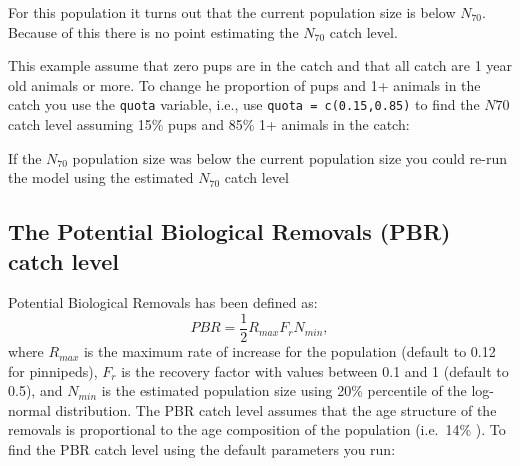 \documentclass[
]{article}
\newenvironment{Shaded}{\begin{snugshade}}{\end{snugshade}}
\newcommand{\CommentTok}[1]{\textcolor[rgb]{0.56,0.35,0.01}{\textit{#1}}}
\newcommand{\DataTypeTok}[1]{\textcolor[rgb]{0.13,0.29,0.53}{#1}}
\newcommand{\KeywordTok}[1]{\textcolor[rgb]{0.13,0.29,0.53}{\textbf{#1}}}
\newcommand{\NormalTok}[1]{#1}
\newcommand{\OperatorTok}[1]{\textcolor[rgb]{0.81,0.36,0.00}{\textbf{#1}}}
\newcommand{\StringTok}[1]{\textcolor[rgb]{0.31,0.60,0.02}{#1}}
\begin{document}
For this population it turns out that the current population size is
below \(N_{70}\). Because of this there is no point estimating the
\(N_{70}\) catch level.

This example assume that zero pups are in the catch and that all catch
are 1 year old animals or more. To change he proportion of pups and 1+
animals in the catch you use the \texttt{quota} variable, i.e., use
\texttt{quota\ =\ c(0.15,0.85)} to find the \(N{70}\) catch level
assuming 15\% pups and 85\% 1+ animals in the catch:

If the \(N_{70}\) population size was below the current population size
you could re-run the model using the estimated \(N_{70}\) catch level

\begin{Shaded}
\end{Shaded}

\hypertarget{the-potential-biological-removals-pbr-catch-level}{%
\subsection{The Potential Biological Removals (PBR) catch
level}\label{the-potential-biological-removals-pbr-catch-level}}

Potential Biological Removals has been defined as:
\[PBR=\frac{1}{2}R_{max}F_rN_{min},\] where \(R_{max}\) is the maximum
rate of increase for the population (default to 0.12 for pinnipeds),
\(F_r\) is the recovery factor with values between 0.1 and 1 (default to
0.5), and \(N_{min}\) is the estimated population size using 20\%
percentile of the log-normal distribution. The PBR catch level assumes
that the age structure of the removals is proportional to the age
composition of the population (i.e.~14\% ). To find the PBR catch level
using the default parameters you run:
\end{document}
